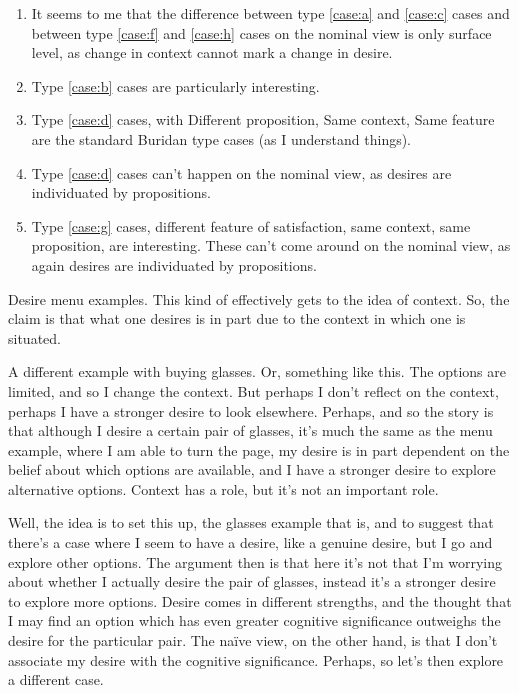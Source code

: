 \documentclass[10pt]{article}
\begin{document}
  \begin{enumerate}
  \item It seems to me that the difference between type \ref{case:a} and \ref{case:c} cases and between type \ref{case:f} and \ref{case:h} cases on the nominal view is only surface level, as change in context cannot mark a change in desire.
  \item Type \ref{case:b} cases are particularly interesting.
  \item Type \ref{case:d} cases, with Different proposition, Same context, Same feature are the standard Buridan type cases (as I understand things).
    \item Type \ref{case:d} cases can't happen on the nominal view, as desires are individuated by propositions.
    \item Type \ref{case:g} cases, different feature of satisfaction, same context, same proposition, are interesting.
      These can't come around on the nominal view, as again desires are individuated by propositions.
  




  \end{enumerate}


\newpage




Desire menu examples.
This kind of effectively gets to the idea of context.
So, the claim is that what one desires is in part due to the context in which one is situated.

A different example with buying glasses.
Or, something like this.
The options are limited, and so I change the context.
But perhaps I don't reflect on the context, perhaps I have a stronger desire to look elsewhere.
Perhaps, and so the story is that although I desire a certain pair of glasses, it's much the same as the menu example, where I am able to turn the page, my desire is in part dependent on the belief about which options are available, and I have a stronger desire to explore alternative options.
Context has a role, but it's not an important role.

Well, the idea is to set this up, the glasses example that is, and to suggest that there's a case where I seem to have a desire, like a genuine desire, but I go and explore other options.
The argument then is that here it's not that I'm worrying about whether I actually desire the pair of glasses, instead it's a stronger desire to explore more options.
Desire comes in different strengths, and the thought that I may find an option which has even greater cognitive significance outweighs the desire for the particular pair.
The na\"{i}ve view, on the other hand, is that I don't associate my desire with the cognitive significance.
Perhaps, so let's then explore a different case.
\end{document}
